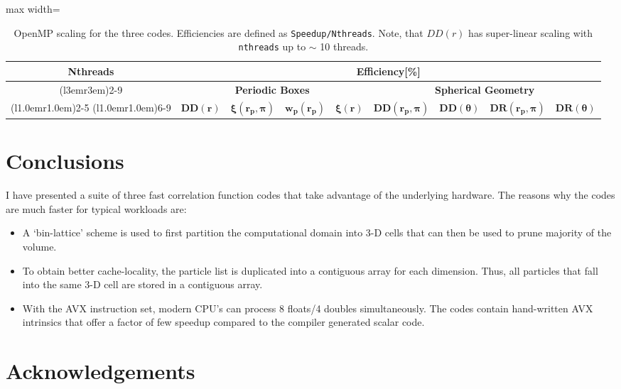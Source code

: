 \documentclass[preprint,authoryear,12pt]{elsarticle}
\newcommand{\xir}{\ensuremath{{DD(r)}}\xspace}
\newcommand{\xiofr}{\ensuremath{{\xi(r)}}\xspace}
\newcommand{\wprp}{\ensuremath{{w_p(r_p)}}\xspace}
\newcommand{\xirppi}{\ensuremath{{\xi(r_p,\pi)}}\xspace}
\begin{document}
\begin{table}
\centering
\caption{\footnotesize OpenMP scaling for the three codes. Efficiencies are defined 
as \texttt{Speedup/Nthreads}. Note, that \xir has super-linear scaling with \texttt{nthreads}
up to $\sim$ 10 threads.}
\begin{adjustbox}{max width=\textwidth}
\begin{tabular}{ccccccccc} 
\toprule
\multirow{3}{*}{\textbf{Nthreads}}   &
\multicolumn{8}{c}{\textbf{Efficiency[\%]}} \\
\cmidrule(l{3em}r{3em}){2-9}

                                     &
\multicolumn{4}{c}{\textbf{Periodic Boxes}}  &
\multicolumn{4}{c}{\textbf{Spherical Geometry}}  \\
\cmidrule(l{1.0em}r{1.0em}){2-5}
\cmidrule(l{1.0em}r{1.0em}){6-9}
                                               &
\multicolumn{1}{c}{$\boldsymbol{\xir}$}        &
\multicolumn{1}{c}{$\boldsymbol{\xirppi}$}     &
\multicolumn{1}{c}{$\boldsymbol{\wprp}$}       & 
\multicolumn{1}{c}{$\boldsymbol{\xiofr}$}      &
\multicolumn{1}{c}{$\boldsymbol{DD(r_p,\pi)}$} &
\multicolumn{1}{c}{$\boldsymbol{DD(\theta)}$}  &
\multicolumn{1}{c}{$\boldsymbol{DR(r_p,\pi)}$} & 
\multicolumn{1}{c}{$\boldsymbol{DR(\theta)}$}   \\
\midrule

\bottomrule
\end{tabular}
\end{adjustbox}
\label{table:openmp}
\end{table}


\section{Conclusions}
I have presented a suite of three fast correlation function codes that take advantage of the underlying hardware. The reasons why the codes 
are much faster for typical workloads are:
\begin{itemize}
\item A `bin-lattice' scheme is used to first partition the computational domain into 3-D cells that can then be used to prune majority of the volume. 
\item To obtain better cache-locality, the particle list is duplicated into a contiguous array for each dimension. Thus, all particles that fall into the
same 3-D cell are stored in a contiguous array. 
\item With the AVX instruction set, modern CPU's can process 8 floats/4 doubles simultaneously. The codes contain hand-written AVX intrinsics that offer a 
factor of few speedup compared to the compiler generated scalar code. 
\end{itemize}

\citet{foreman-mackey_etal_13}

\section*{Acknowledgements}



\end{document}
